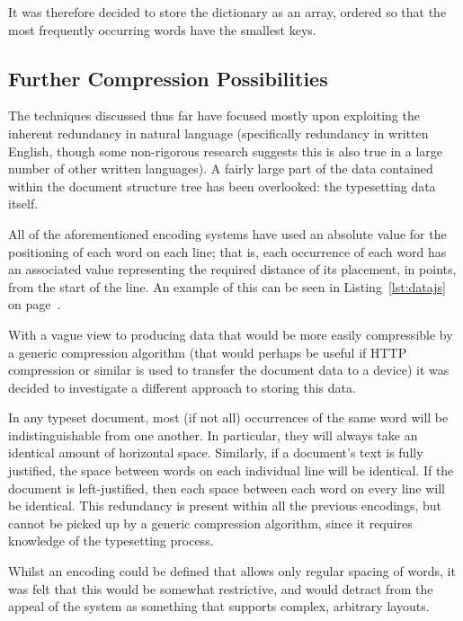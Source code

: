 It was therefore decided to store the dictionary as an array, ordered so that the most frequently occurring words have the smallest keys.

\subsection{Further Compression Possibilities}
\label{sec:deltas}

The techniques discussed thus far have focused mostly upon exploiting the inherent redundancy in natural language (specifically redundancy in written English, though some non-rigorous research suggests this is also true in a large number of other written languages). A fairly large part of the data contained within the document structure tree has been overlooked: the typesetting data itself.

All of the aforementioned encoding systems have used an absolute value for the positioning of each word on each line; that is, each occurrence of each word has an associated value representing the required distance of its placement, in \glspl{point}, from the start of the line. An example of this can be seen in Listing~\ref{lst:datajs} on page~\pageref{lst:datajs}.

With a vague view to producing data that would be more easily compressible by a generic compression algorithm (that would perhaps be useful if HTTP compression or similar is used to transfer the document data to a device) it was decided to investigate a different approach to storing this data.

In any typeset document, most (if not all) occurrences of the same word will be indistinguishable from one another. In particular, they will always take an identical amount of horizontal space. Similarly, if a document's text is fully justified, the space between words on each individual line will be identical. If the document is left-justified, then each space between each word on every line will be identical. This redundancy is present within all the previous encodings, but cannot be picked up by a generic compression algorithm, since it requires knowledge of the typesetting process.

Whilst an encoding could be defined that allows only regular spacing of words, it was felt that this would be somewhat restrictive, and would detract from the appeal of the system as something that supports complex, arbitrary layouts.

